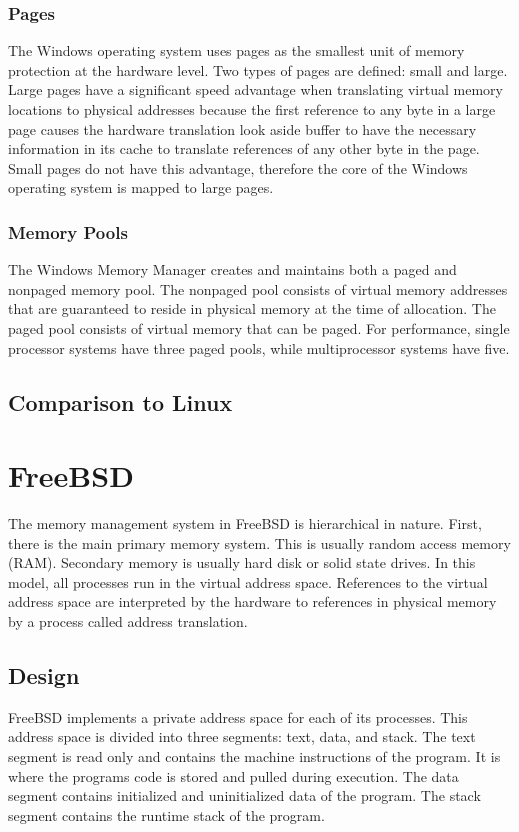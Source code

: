 \documentclass[letterpaper,draftclsnofoot,10pt,onecolumn,titlepage]{IEEEtran}\usepackage[margin=0.75in]{geometry}
\begin{document}
\subsubsection{Pages}
The Windows operating system uses pages as the smallest unit of memory protection at the hardware level.
Two types of pages are defined: small and large. Large pages have a significant speed advantage when 
translating virtual memory locations to physical addresses because the first reference to any byte in a 
large page causes the hardware translation look aside buffer to have the necessary information in its 
cache to translate references of any other byte in the page. Small pages do not have this advantage,
therefore the core of the Windows operating system is mapped to large pages.

\subsubsection{Memory Pools}
The Windows Memory Manager creates and maintains both a paged and nonpaged memory pool. The nonpaged 
pool consists of virtual memory addresses that are guaranteed to reside in physical memory at the 
time of allocation. The paged pool consists of virtual memory that can be paged. For performance,
single processor systems have three paged pools, while multiprocessor systems have five.

\subsection{Comparison to Linux}


\section{FreeBSD}
The memory management system in FreeBSD is hierarchical in nature. First, there is the main primary memory system.
This is usually random access memory (RAM). Secondary memory is usually hard disk or solid state drives. In 
this model, all processes run in the virtual address space. References to the virtual address space are 
interpreted by the hardware to references in physical memory by a process called address translation.


\subsection{Design}
FreeBSD implements a private address space for each of its processes. This address space is divided into three 
segments: text, data, and stack. The text segment is read only and contains the machine instructions of 
the program. It is where the programs code is stored and pulled during execution. The data segment 
contains initialized and uninitialized data of the program. The stack segment contains the runtime stack 
of the program.
\end{document}
